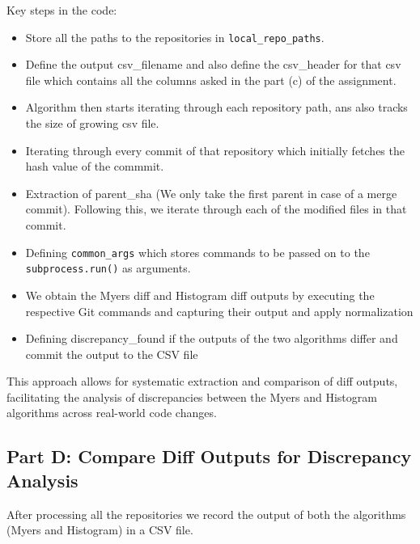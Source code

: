 \documentclass[12pt,a4paper]{article}
\begin{document}
Key steps in the code:
\begin{itemize}
    \item Store all the paths to the repositories in \texttt{local\_repo\_paths}.
    \item Define the output csv\_filename and also define the csv\_header for that csv file which contains all the columns asked in the part (c) of the assignment.
    \item Algorithm then starts iterating through each repository path, ans also tracks the size of growing csv file.
    \item Iterating through every commit of that repository which initially fetches the hash value of the commmit.
    \item Extraction of parent\_sha (We only take the first parent in case of a merge commit). Following this, we iterate through each of the modified files in that commit.
    \item Defining \texttt{common\_args} which stores commands to be passed on to the \texttt{subprocess.run()} as arguments.
    \item We obtain the Myers diff and Histogram diff outputs by executing the respective Git commands and capturing their output and apply normalization
    \item Defining discrepancy\_found if the outputs of the two algorithms differ and commit the output to the CSV file
\end{itemize}

This approach allows for systematic extraction and comparison of diff outputs, facilitating the analysis of discrepancies between the Myers and Histogram algorithms across real-world code changes.

\subsection*{Part D: Compare Diff Outputs for Discrepancy Analysis}

After processing all the repositories we record the output of both the algorithms (Myers and Histogram) in a CSV file.
\end{document}
